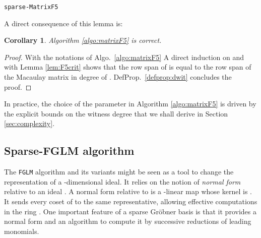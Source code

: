 \documentclass[12pt]{article}
\numberwithin{equation}{section}
\numberwithin{theorem}{section}
\newtheorem{corollary}[theorem]{Corollary}
\begin{document}
\begin{algorithm}\label{algo:matrixF5}
\lFor{ \KwTo }{

}

\Return{}
\caption{{\tt sparse-MatrixF5}}
\end{algorithm}
A direct consequence of this lemma is:
\begin{corollary}
Algorithm \ref{algo:matrixF5} is correct.
\end{corollary}
\begin{proof}
With the notations of Algo.~\ref{algo:matrixF5} A direct induction on  and  with Lemma \ref{lem:F5crit} shows that the row span of  is equal to the row span of the Macaulay matrix in degree  of . DefProp.~\ref{defprop:dwit} concludes the proof.
\end{proof}

In practice, the choice of the parameter  in Algorithm \ref{algo:matrixF5} is driven by the explicit bounds on the witness degree that we shall derive in Section \ref{sec:complexity}.



\subsection{Sparse-FGLM algorithm}
\label{subsec:sparse-fglm}
The {\tt FGLM} algorithm and its variants might be seen as a tool to change
the representation of a -dimensional ideal. It relies on the notion
of \emph{normal form} relative to an ideal . A normal form relative to  is a -linear map
 whose kernel is . It sends every coset of  to the same representative, allowing effective computations in the ring .
One important feature of a sparse Gr\"obner
basis is that it provides a normal form and an algorithm to compute
it by successive reductions of leading monomials.
\end{document}
